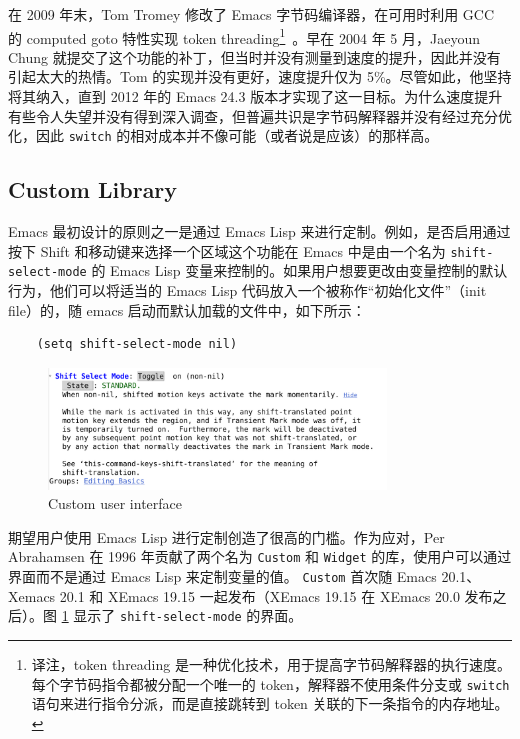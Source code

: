 \documentclass[format=acmsmall,screen]{acmart}
\begin{document}
在 2009 年末，Tom Tromey 修改了 Emacs 字节码编译器，在可用时利用 GCC 的 computed goto 特性实现 token threading\footnote{译注，token threading 是一种优化技术，用于提高字节码解释器的执行速度。每个字节码指令都被分配一个唯一的 token，解释器不使用条件分支或 \texttt{switch} 语句来进行指令分派，而是直接跳转到 token 关联的下一条指令的内存地址。}~\cite{ComputedGOTO}。早在 2004 年 5 月，Jaeyoun Chung 就提交了这个功能的补丁，但当时并没有测量到速度的提升，因此并没有引起太大的热情。Tom 的实现并没有更好，速度提升仅为 5\%。尽管如此，他坚持将其纳入，直到 2012 年的 Emacs 24.3 版本才实现了这一目标。为什么速度提升有些令人失望并没有得到深入调查，但普遍共识是字节码解释器并没有经过充分优化，因此 \texttt{switch} 的相对成本并不像可能（或者说是应该）的那样高。

\subsection{Custom Library}
\label{sec:custom}

Emacs 最初设计的原则之一是通过 Emacs Lisp 来进行定制。例如，是否启用通过按下 Shift 和移动键来选择一个区域这个功能在 Emacs 中是由一个名为 \texttt{shift-select-mode} 的 Emacs Lisp 变量来控制的。如果用户想要更改由变量控制的默认行为，他们可以将适当的 Emacs Lisp 代码放入一个被称作“初始化文件”（init file）的，随 emacs 启动而默认加载的文件中，如下所示：

%
\begin{verbatim}
    (setq shift-select-mode nil)
\end{verbatim}
%
\begin{figure}[tb]
  \centering
  \includegraphics[width=0.8\textwidth]{custom}
  \caption{Custom user interface}
  \label{fig:custom}
\end{figure}
%

期望用户使用 Emacs Lisp 进行定制创造了很高的门槛。作为应对，Per Abrahamsen 在 1996 年贡献了两个名为 \texttt{Custom} 和 \texttt{Widget} 的库，使用户可以通过界面而不是通过 Emacs Lisp 来定制变量的值。 \texttt{Custom} 首次随 Emacs 20.1、Xemacs 20.1 和 XEmacs 19.15 一起发布（XEmacs 19.15 在 XEmacs 20.0 发布之后）。图 \ref{fig:custom} 显示了 \texttt{shift-select-mode} 的界面。
\end{document}
